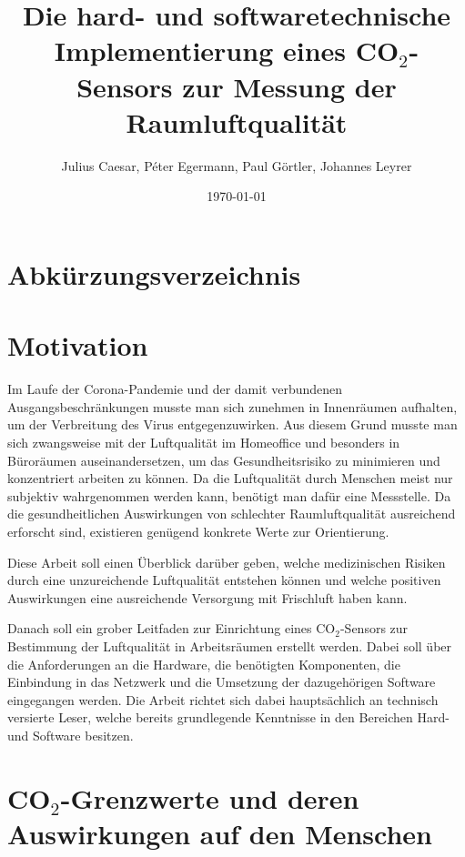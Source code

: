 \documentclass[a4paper,
    11pt,
    headings=small,
    ngerman,
    listof=totoc,
    numbers=noenddot]{scrreprt}[2021/11/13]
\title{Die hard- und softwaretechnische Implementierung eines CO$_2$-Sensors zur Messung der Raumluftqualität}
\author{Julius Caesar, Péter Egermann, Paul Görtler, Johannes Leyrer}
\date{\today}
\begin{document}
\maketitle

\newpage

\tableofcontents

\newpage

\chapter*{Abkürzungsverzeichnis}

\begin{acronym}[API]
\end{acronym}

\newpage


\chapter{Motivation}

Im Laufe der Corona-Pandemie und der damit verbundenen Ausgangsbeschränkungen musste man sich zunehmen in Innenräumen aufhalten, um der Verbreitung des Virus entgegenzuwirken. Aus diesem Grund musste man sich zwangsweise mit der Luftqualität im Homeoffice und besonders in Büroräumen auseinandersetzen, um das Gesundheitsrisiko zu minimieren und konzentriert arbeiten zu können. Da die Luftqualität durch Menschen meist nur subjektiv wahrgenommen werden kann, benötigt man dafür eine Messstelle. Da die gesundheitlichen Auswirkungen von schlechter Raumluftqualität ausreichend erforscht sind, existieren genügend konkrete Werte zur Orientierung.

Diese Arbeit soll einen Überblick darüber geben, welche medizinischen Risiken durch eine unzureichende Luftqualität entstehen können und welche positiven Auswirkungen eine ausreichende Versorgung mit Frischluft haben kann.

Danach soll ein grober Leitfaden zur Einrichtung eines CO$_2$-Sensors zur Bestimmung der Luftqualität in Arbeitsräumen erstellt werden. Dabei soll über die Anforderungen an die Hardware, die benötigten Komponenten, die Einbindung in das Netzwerk und die Umsetzung der dazugehörigen Software eingegangen werden. Die Arbeit richtet sich dabei hauptsächlich an technisch versierte Leser, welche bereits grundlegende Kenntnisse in den Bereichen Hard- und Software besitzen.



\chapter{CO$_2$-Grenzwerte und deren Auswirkungen auf den Menschen}
\end{document}
